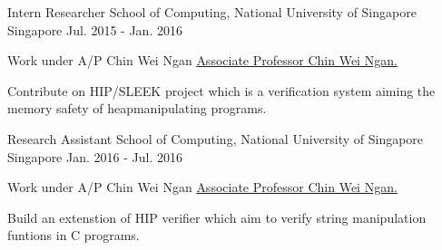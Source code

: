 

\begin{cventries}

  \cventry
    {Intern Researcher} %
    {School of Computing, National University of Singapore} %
    {Singapore} %
    {Jul. 2015 - Jan. 2016} %
    {
      \begin{cvitems} %
        \item {Work under A/P Chin Wei Ngan \href{https://www.comp.nus.edu.sg/~chinwn/}{Associate Professor Chin Wei Ngan.}}
        \item {Contribute on HIP/SLEEK project which is a verification system aiming the memory safety of heapmanipulating programs.}
      \end{cvitems}
    }

  \cventry
    {Research Assistant} %
    {School of Computing, National University of Singapore} %
    {Singapore} %
    {Jan. 2016 - Jul. 2016} %
    {
      \begin{cvitems} %
        \item {Work under A/P Chin Wei Ngan \href{https://www.comp.nus.edu.sg/~chinwn/}{Associate Professor Chin Wei Ngan.}}
        \item {Build an extenstion of HIP verifier which aim to verify string manipulation funtions in C programs.}
      \end{cvitems}
    }



\end{cventries}
